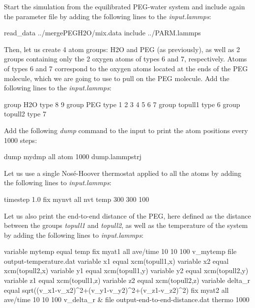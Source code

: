 \noindent Start the simulation from the equilibrated PEG-water system and include
again the parameter file by adding the following lines to the \textit{input.lammps}:

\begin{lcverbatim}
read_data ../mergePEGH2O/mix.data
include ../PARM.lammps
\end{lcverbatim}

\noindent Then, let us create 4 atom groups: H2O and PEG (as previously), as well
as 2 groups containing only the 2 oxygen atoms of types 6 and 7,
respectively. Atoms of types 6 and 7 correspond to the oxygen atoms
located at the ends of the PEG molecule, which we are going to use to pull
on the PEG molecule. Add the following lines to the \textit{input.lammps}:

\begin{lcverbatim}
group H2O type 8 9
group PEG type 1 2 3 4 5 6 7
group topull1 type 6
group topull2 type 7
\end{lcverbatim}

\noindent Add the following \textit{dump} command to the input to print the atom positions
every 1000 steps:

\begin{lcverbatim}
dump mydmp all atom 1000 dump.lammpstrj
\end{lcverbatim}

\noindent Let us use a single Nosé-Hoover thermostat applied to all the atoms by
adding the following lines to \textit{input.lammps}:

\begin{lcverbatim}
timestep 1.0
fix mynvt all nvt temp 300 300 100
\end{lcverbatim}

\noindent Let us also print the end-to-end distance of the PEG,
here defined as the distance between the groups \textit{topull1}
and \textit{topull2}, as well as the temperature of the system 
by adding the following lines to \textit{input.lammps}:

\begin{lcverbatim}
variable mytemp equal temp
fix myat1 all ave/time 10 10 100 v_mytemp file output-temperature.dat
variable x1 equal xcm(topull1,x)
variable x2 equal xcm(topull2,x)
variable y1 equal xcm(topull1,y)
variable y2 equal xcm(topull2,y)
variable z1 equal xcm(topull1,z)
variable z2 equal xcm(topull2,z)
variable delta_r equal sqrt((v_x1-v_x2)^2+(v_y1-v_y2)^2+(v_z1-v_z2)^2)
fix myat2 all ave/time 10 10 100 v_delta_r &
    file output-end-to-end-distance.dat
thermo 1000
\end{lcverbatim}

